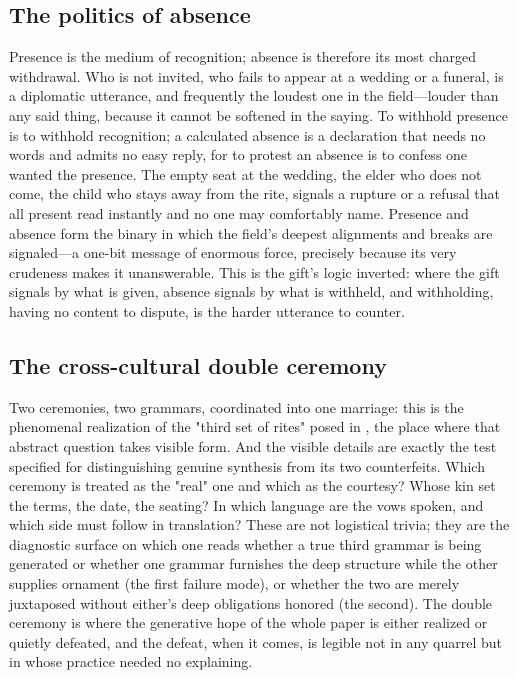 \subsection{The politics of absence}
Presence is the medium of recognition; absence is therefore its most charged withdrawal. Who is not invited, who fails to appear at a wedding or a funeral, is a diplomatic utterance, and frequently the loudest one in the field---louder than any said thing, because it cannot be softened in the saying. To withhold presence is to withhold recognition; a calculated absence is a declaration that needs no words and admits no easy reply, for to protest an absence is to confess one wanted the presence. The empty seat at the wedding, the elder who does not come, the child who stays away from the rite, signals a rupture or a refusal that all present read instantly and no one may comfortably name. Presence and absence form the binary in which the field's deepest alignments and breaks are signaled---a one-bit message of enormous force, precisely because its very crudeness makes it unanswerable. This is the gift's logic inverted: where the gift signals by what is given, absence signals by what is withheld, and withholding, having no content to dispute, is the harder utterance to counter.

\subsection{The cross-cultural double ceremony}
Two ceremonies, two grammars, coordinated into one marriage: this is the phenomenal realization of the "third set of rites" posed in , the place where that abstract question takes visible form. And the visible details are exactly the test  specified for distinguishing genuine synthesis from its two counterfeits. Which ceremony is treated as the "real" one and which as the courtesy? Whose kin set the terms, the date, the seating? In which language are the vows spoken, and which side must follow in translation? These are not logistical trivia; they are the diagnostic surface on which one reads whether a true third grammar is being generated or whether one grammar furnishes the deep structure while the other supplies ornament (the first failure mode), or whether the two are merely juxtaposed without either's deep obligations honored (the second). The double ceremony is where the generative hope of the whole paper is either realized or quietly defeated, and the defeat, when it comes, is legible not in any quarrel but in whose practice needed no explaining.

